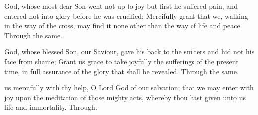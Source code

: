 	 God, whose most dear Son went not up to joy but first he suffered pain, and entered not into glory before he was crucified; Mercifully grant that we, walking in the way of the cross, may find it none other than the way of life and peace. Through the same.
	
\vspace{-0.2\baselineskip}

	
\vspace{-0.1\baselineskip}

	 God, whose blessed Son, our Saviour, gave his back to the smiters and hid not his face from shame; Grant us grace to take joyfully the sufferings of the present time, in full assurance of the glory that shall be revealed. Through the same.
	
\vspace{-0.2\baselineskip}

	
\vspace{-0.1\baselineskip}

     us mercifully with thy help, O Lord God of our salvation; that we may enter with joy upon the meditation of those mighty acts, whereby thou hast given unto us life and immortality. Through.
	
\vspace{-0.2\baselineskip}

    

